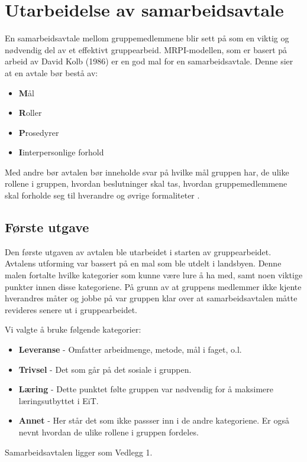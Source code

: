 \section{Utarbeidelse av samarbeidsavtale}
En samarbeidsavtale mellom gruppemedlemmene blir sett på som en viktig og nødvendig del av et effektivt gruppearbeid. 
MRPI-modellen, som er basert på arbeid av David Kolb (1986) er en god mal for en samarbeidsavtale. 
Denne sier at en avtale bør bestå av:
\begin{itemize}
  \item \textbf{M}ål
  \item \textbf{R}oller
  \item \textbf{P}rosedyrer
  \item \textbf{I}interpersonlige forhold
\end{itemize}
Med andre bør avtalen bør inneholde svar på hvilke mål gruppen har, de ulike rollene i gruppen, hvordan beslutninger skal tas, hvordan gruppemedlemmene skal forholde seg til hverandre og øvrige formaliteter \citep{levin}.

\subsection*{Første utgave}
Den første utgaven av avtalen ble utarbeidet i starten av gruppearbeidet. 
Avtalens utforming var bassert på en mal som ble utdelt i landsbyen. 
Denne malen fortalte hvilke kategorier som kunne være lure å ha med, samt noen viktige punkter innen disse kategoriene. 
På grunn av at gruppens medlemmer ikke kjente hverandres måter og jobbe på var gruppen klar over at samarbeidsavtalen måtte revideres senere ut i gruppearbeidet. 
\vspace{\secspace}

Vi valgte å bruke følgende kategorier:
\begin{itemize}
    \item \textbf{Leveranse} - Omfatter arbeidmenge, metode, mål i faget, o.l.
    \item \textbf{Trivsel} - Det som går på det sosiale i gruppen. 
    \item \textbf{Læring} - Dette punktet følte gruppen var nødvendig for å maksimere læringsutbyttet i EiT. 
    \item \textbf{Annet} - Her står det som ikke passser inn i de andre kategoriene. Er også nevnt hvordan de ulike rollene i gruppen fordeles. 
\end{itemize}
Samarbeidsavtalen ligger som Vedlegg 1. 

